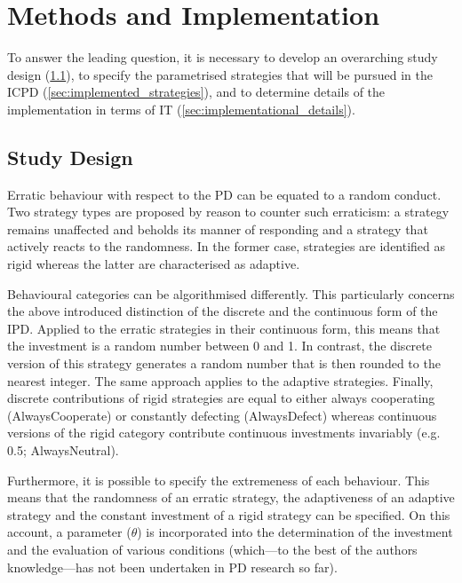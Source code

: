 \documentclass[11pt]{article}
\begin{document}
\section{Methods and Implementation} \label{sec:methods_and_implementation}

To answer the leading question, it is necessary to develop an overarching study design (\ref{sec:study_design}), to specify the parametrised strategies that will be pursued in the ICPD (\ref{sec:implemented_strategies}), and to determine details of the implementation in terms of IT (\ref{sec:implementational_details}).

\subsection{Study Design} \label{sec:study_design}

Erratic behaviour with respect to the PD can be equated to a random conduct.
Two strategy types are proposed by reason to counter such erraticism:
a strategy remains unaffected and beholds its manner of responding and a strategy that actively reacts to the randomness.
In the former case, strategies are identified as rigid whereas the latter are characterised as adaptive.

Behavioural categories can be algorithmised differently.
This particularly concerns the above introduced distinction of the discrete and the continuous form of the IPD.
Applied to the erratic strategies in their continuous form, this means that the investment is a random number between 0 and 1.
In contrast, the discrete version of this strategy generates a random number that is then rounded to the nearest integer.
The same approach applies to the adaptive strategies.
Finally, discrete contributions of rigid strategies are equal to either always cooperating (AlwaysCooperate) or constantly defecting (AlwaysDefect) whereas continuous versions of the rigid category contribute continuous investments invariably (e.g. 0.5; AlwaysNeutral).

Furthermore, it is possible to specify the extremeness of each behaviour.
This means that the randomness of an erratic strategy, the adaptiveness of an adaptive strategy and the constant investment of a rigid strategy can be specified.
On this account, a parameter ($\theta$) is incorporated into the determination of the investment and the evaluation of various conditions (which---to the best of the authors knowledge---has not been undertaken in PD research so far).
\end{document}
